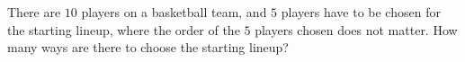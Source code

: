 There are $10$ players on a basketball team, and $5$ players have to be chosen for the starting lineup, where the order of the $5$ players chosen does not matter. How many ways are there to choose the starting lineup?
